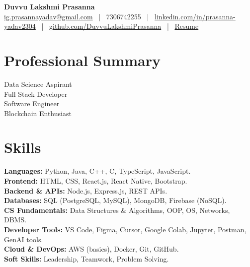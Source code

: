 \documentclass[9.5pt, letterpaper]{article}
\begin{document}
\begin{center}
  {\LARGE\bfseries Duvvu Lakshmi Prasanna}\\[2pt]
  \small
  \href{mailto:ig.prasannayadav@gmail.com}{ig.prasannayadav@gmail.com}
  ~|~ 7306742255
  ~|~ \href{https://www.linkedin.com/in/prasanna-yadav2304}{linkedin.com/in/prasanna-yadav2304}
  ~|~ \href{https://github.com/DuvvuLakshmiPrasanna}{github.com/DuvvuLakshmiPrasanna}
  ~|~ \href{https://drive.google.com/file/d/1r0EP0ru71Zi08469QAI2b3S7EdA8offd/view?usp=drive_link}{Resume}
\end{center}

\vspace{2pt}

\section{Professional Summary}
{\setlength{\parskip}{1.0pt}\small%
\noindent Data Science Aspirant\\
\noindent Full Stack Developer\\
\noindent Software Engineer\\
\noindent Blockchain Enthusiast%
}

\vspace{2pt}

\section{Skills}
{\setlength{\parskip}{1.0pt}\small%
\noindent\textbf{Languages:} Python, Java, C++, C, TypeScript, JavaScript.\\
\noindent\textbf{Frontend:} HTML, CSS, React.js, React Native, Bootstrap.\\
\noindent\textbf{Backend \& APIs:} Node.js, Express.js, REST APIs.\\
\noindent\textbf{Databases:} SQL (PostgreSQL, MySQL), MongoDB, Firebase (NoSQL).\\
\noindent\textbf{CS Fundamentals:} Data Structures \& Algorithms, OOP, OS, Networks, DBMS.\\
\noindent\textbf{Developer Tools:} VS Code, Figma, Cursor, Google Colab, Jupyter, Postman, GenAI tools.\\
\noindent\textbf{Cloud \& DevOps:} AWS (basics), Docker, Git, GitHub.\\
\noindent\textbf{Soft Skills:} Leadership, Teamwork, Problem Solving.%
}
\end{document}
